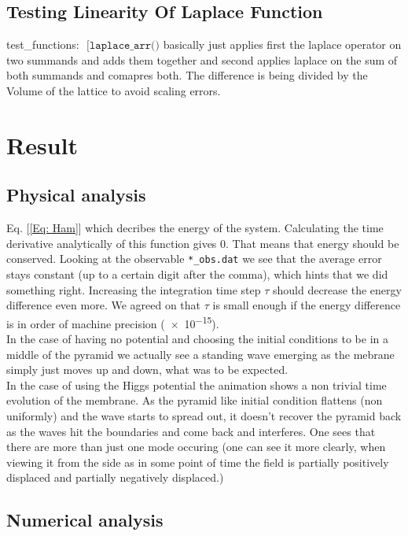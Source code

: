 \documentclass[11pt,a4paper]{article}
\begin{document}
\subsection{Testing Linearity Of Laplace Function}

test\_functions: $\texttt{ [laplace\_arr()} $ basically just applies first the laplace operator on two summands and adds them together and second applies laplace on the sum of both summands and comapres both. The difference is being divided by the Volume of the lattice to avoid scaling errors.


\section{Result}

\subsection{Physical analysis}

Eq. [\ref{Eq: Ham}] which decribes the energy of the system. Calculating the
time derivative analytically of this function gives 0. That means that energy
should be conserved. Looking at the observable \verb|*_obs.dat| we see that the
average error stays constant (up to a certain digit after the comma), which
hints that we did something right. Increasing the integration time step $\tau$
should decrease the energy difference even more. We agreed on that $\tau$ is
small enough if the energy difference is in order of machine precision
(\num{e-15}). \\
In the case of having no potential and choosing the initial conditions to be in
a middle of the pyramid we actually see a standing wave emerging as the mebrane
simply just moves up and down, what was to be expected. \\
In the case of using the Higgs potential the animation shows a non trivial
time evolution of the membrane. As the pyramid like
initial condition flattens (non uniformly) and the wave starts to spread out, it
doesn't recover the pyramid back as the waves hit the boundaries and come back
and interferes. One sees that there are more than just one mode occuring (one
can see it more clearly, when viewing it from the side as in some point of time
the field is partially positively displaced and partially negatively displaced.)

\subsection{Numerical analysis}
\end{document}
